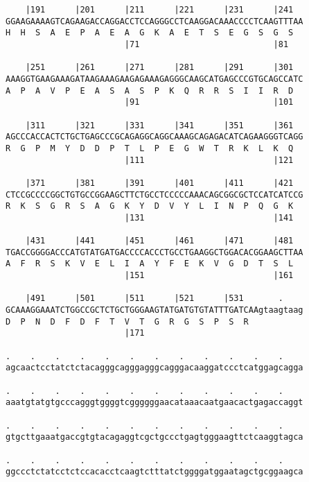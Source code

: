 \documentclass{article}
\begin{document}
\begin{Verbatim}
    |191      |201      |211      |221      |231      |241  
GGAAGAAAAGTCAGAAGACCAGGACCTCCAGGGCCTCAAGGACAAACCCCTCAAGTTTAA
H  H  S  A  E  P  A  E  A  G  K  A  E  T  S  E  G  S  G  S  
                        |71                           |81   
  
    |251      |261      |271      |281      |291      |301  
AAAGGTGAAGAAAGATAAGAAAGAAGAGAAAGAGGGCAAGCATGAGCCCGTGCAGCCATC
A  P  A  V  P  E  A  S  A  S  P  K  Q  R  R  S  I  I  R  D  
                        |91                           |101  
  
    |311      |321      |331      |341      |351      |361  
AGCCCACCACTCTGCTGAGCCCGCAGAGGCAGGCAAAGCAGAGACATCAGAAGGGTCAGG
R  G  P  M  Y  D  D  P  T  L  P  E  G  W  T  R  K  L  K  Q  
                        |111                          |121  
  
    |371      |381      |391      |401      |411      |421  
CTCCGCCCCGGCTGTGCCGGAAGCTTCTGCCTCCCCCAAACAGCGGCGCTCCATCATCCG
R  K  S  G  R  S  A  G  K  Y  D  V  Y  L  I  N  P  Q  G  K  
                        |131                          |141  
  
    |431      |441      |451      |461      |471      |481  
TGACCGGGGACCCATGTATGATGACCCCACCCTGCCTGAAGGCTGGACACGGAAGCTTAA
A  F  R  S  K  V  E  L  I  A  Y  F  E  K  V  G  D  T  S  L  
                        |151                          |161  
  
    |491      |501      |511      |521      |531       .    
GCAAAGGAAATCTGGCCGCTCTGCTGGGAAGTATGATGTGTATTTGATCAAgtaagtaag
D  P  N  D  F  D  F  T  V  T  G  R  G  S  P  S  R           
                        |171                                
  
.    .    .    .    .    .    .    .    .    .    .    .    
agcaactcctatctctacagggcagggagggcagggacaaggatccctcatggagcagga
                                                            
.    .    .    .    .    .    .    .    .    .    .    .    
aaatgtatgtgcccagggtggggtcggggggaacataaacaatgaacactgagaccaggt
                                                            
.    .    .    .    .    .    .    .    .    .    .    .    
gtgcttgaaatgaccgtgtacagaggtcgctgccctgagtgggaagttctcaaggtagca
                                                            
.    .    .    .    .    .    .    .    .    .    .    .    
ggccctctatcctctccacacctcaagtctttatctggggatggaatagctgcggaagca
                                                            

\end{Verbatim}
\end{document}
